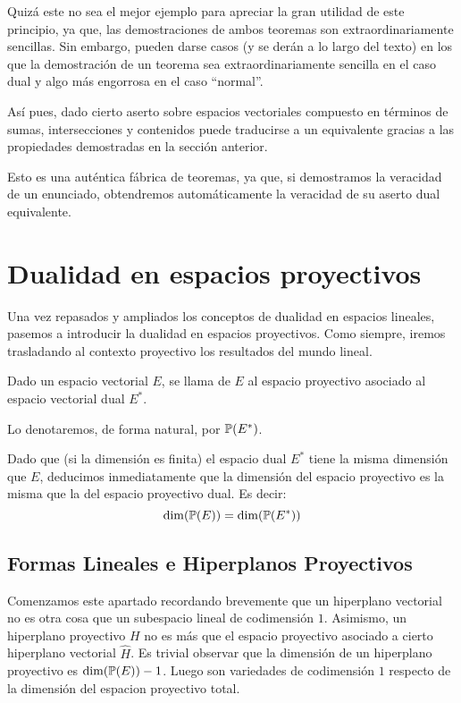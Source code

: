 Quizá este no sea el mejor ejemplo para apreciar la gran utilidad de este principio, ya que, las demostraciones de ambos teoremas son extraordinariamente sencillas. Sin embargo, pueden darse casos (y se derán a lo largo del texto) en los que la demostración de un teorema sea extraordinariamente sencilla en el caso dual y algo más engorrosa en el caso ``normal''.

Así pues, dado cierto aserto sobre espacios vectoriales compuesto en términos de sumas, intersecciones y contenidos puede traducirse a un  equivalente gracias a las propiedades demostradas en la sección anterior.

Esto es una auténtica fábrica de teoremas, ya que, si demostramos la veracidad de un enunciado, obtendremos automáticamente la veracidad de su aserto dual equivalente. 
\section{Dualidad en espacios proyectivos}
Una vez repasados y ampliados los conceptos de dualidad en espacios lineales, pasemos a introducir la dualidad en espacios proyectivos. Como siempre, iremos trasladando al contexto proyectivo los resultados del mundo lineal.
\begin{defi}
	Dado un espacio vectorial $E$, se llama  de $E$ al espacio proyectivo asociado al espacio vectorial dual $E^*$.
	
	Lo denotaremos, de forma natural, por $\mathbb{P}(E^*)$.
\end{defi}
\begin{obs}
	Dado que (si la dimensión es finita) el espacio dual $E^*$ tiene la misma dimensión que $E$, deducimos inmediatamente que la dimensión del espacio proyectivo es la misma que la del espacio proyectivo dual. Es decir:
	\begin{equation}
	\dim(\mathbb{P}(E))=\dim (\mathbb{P}(E^*))
	\end{equation}
\end{obs}

\subsection{Formas Lineales e Hiperplanos Proyectivos}

Comenzamos este apartado recordando brevemente que un hiperplano vectorial no es otra cosa que un subespacio lineal de codimensión $1$. Asimismo, un hiperplano proyectivo $H$ no es más que el espacio proyectivo asociado a cierto hiperplano vectorial $\widehat{H}$. Es trivial observar que la dimensión de un hiperplano proyectivo es $\dim(\mathbb{P}(E))-1$. Luego son variedades de codimensión $1$ respecto de la dimensión del espacion proyectivo total.\\

